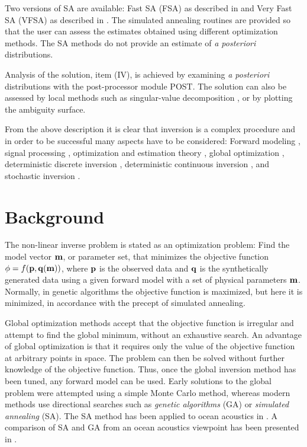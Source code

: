 \documentclass{saclantc}
\begin{document}
Two versions of SA are available: Fast SA (FSA) as
described in \cite{collins:asa92} and Very Fast SA (VFSA) as described in
\cite{ingber:89,ingber:93}.  The simulated annealing routines are provided
so that the user can assess  the estimates obtained using different
optimization methods. The SA methods do not provide an estimate
of {\it a posteriori} distributions. 

Analysis of the solution, item (IV), is achieved by
 examining {\em a posteriori} distributions with the post-processor module {\sf POST}.  The solution can also be
 assessed by local methods such as  singular-value
 decomposition \cite{gerstoft:asa94,caiti:ieee94,pg:cop94}, or by plotting
 the ambiguity surface.

From the above description it is clear that inversion is a complex
procedure  and in order to be  successful  many aspects
have to be considered: Forward modeling \cite{jensen}, signal
processing \cite{tolstoy, kay}, optimization and estimation
theory \cite{bard}, global optimization \cite{sen95},
deterministic discrete inversion \cite{menke}, 
deterministic continuous inversion \cite{parker}, and 
stochastic inversion \cite{tarantola}.


\section{Background}

The non-linear inverse problem is stated as an optimization problem:
Find the model vector $\bf m$, or parameter set, that minimizes the
objective function $\phi= f( {\bf p}, {\bf q}( {\bf m}) )$, where
$\bf p$ is the observed data and $\bf q$ is the synthetically
generated data using a given forward model with a set of physical
parameters $\bf m $.
Normally, in genetic algorithms the objective function is
maximized, but here it is  minimized, 
in accordance with the precept of simulated annealing.  
    
Global optimization methods accept that the objective function is
irregular and attempt to find the global minimum, without an
exhaustive search. An advantage of global optimization is that it
requires only the value of the objective function at arbitrary points in
space. The problem can then be solved without further knowledge of
the objective function.  Thus, once the global inversion method has been
tuned, any forward model can be used.
Early solutions to the global problem were attempted using a simple
Monte Carlo method, whereas modern methods use directional searches
such as {\it genetic algorithms} (GA) or {\it simulated annealing}
(SA).
The SA method has been applied to ocean acoustics in 
\cite{collins:asa92,collins:asa91,lindsay:ieee93,dosso:ieee93}.
A comparison of SA and GA from an ocean acoustics viewpoint has been
presented in \cite{gerstoft:ecua98}.
\end{document}
